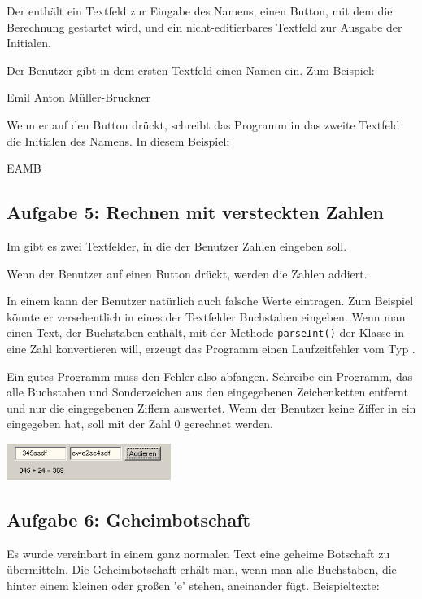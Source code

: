 Der  enthält ein Textfeld zur Eingabe des Namens, einen Button,
mit dem die Berechnung gestartet wird, und ein nicht-editierbares Textfeld zur
Ausgabe der Initialen.

Der Benutzer gibt in dem ersten Textfeld einen Namen ein. Zum Beispiel:

Emil Anton Müller-Bruckner

Wenn er auf den Button drückt, schreibt das Programm in das zweite Textfeld die
Initialen des Namens. In diesem Beispiel:

EAMB


\subsection{Aufgabe 5: Rechnen mit versteckten Zahlen}

Im  gibt es zwei Textfelder, in die der Benutzer Zahlen eingeben
soll.

Wenn der Benutzer auf einen Button drückt, werden die Zahlen addiert.

In einem  kann der Benutzer natürlich auch falsche Werte
eintragen. Zum Beispiel könnte er versehentlich in eines der Textfelder
Buchstaben eingeben. Wenn man einen Text, der Buchstaben enthält, mit der
Methode \lstinline|parseInt()| der Klasse  in eine Zahl
konvertieren will, erzeugt das Programm einen Laufzeitfehler vom Typ
.

Ein gutes Programm muss den Fehler also abfangen. Schreibe ein Programm, das
alle Buchstaben und Sonderzeichen aus den eingegebenen Zeichenketten entfernt
und nur die eingegebenen Ziffern auswertet. Wenn der Benutzer keine Ziffer in
ein  eingegeben hat, soll mit der Zahl 0 gerechnet werden.

\includegraphics[width=0.4\textwidth]{./inf/SEKII/24_Java_GUI-Komponenten/RechnenMitVerstecktenZahlen.png}


\subsection{Aufgabe 6: Geheimbotschaft}

Es wurde vereinbart in einem ganz normalen Text eine geheime Botschaft zu
übermitteln. Die Geheimbotschaft erhält man, wenn man alle Buchstaben, die
hinter einem kleinen oder großen ’e’ stehen, aneinander fügt. Beispieltexte:

